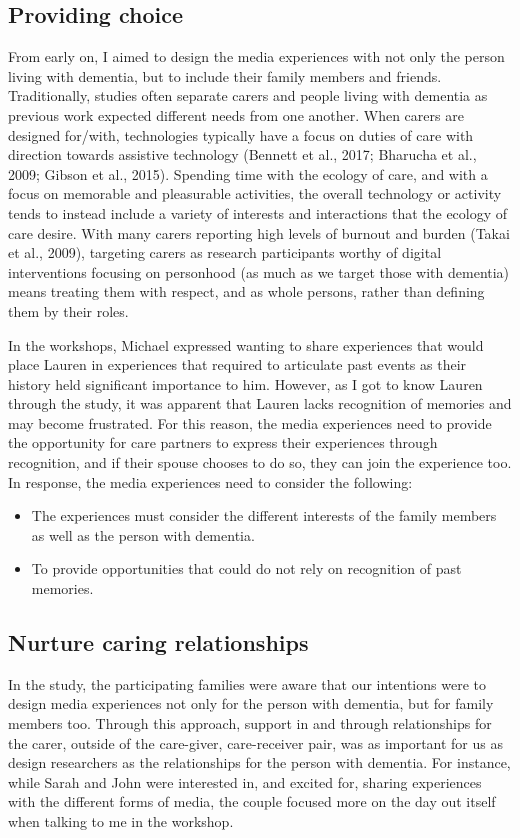 \subsection{Providing choice}
\label{DR:ProvidingChoice}
From early on, I aimed to design the media experiences with not only the person living with dementia, but to include their family members and friends. Traditionally, studies often separate carers and people living with dementia as previous work expected different needs from one another. When carers are designed for/with, technologies typically have a focus on duties of care with direction towards assistive technology (Bennett et al., 2017; Bharucha et al., 2009; Gibson et al., 2015). Spending time with the ecology of care, and with a focus on memorable and pleasurable activities, the overall technology or activity tends to instead include a variety of interests and interactions that the ecology of care desire. With many carers reporting high levels of burnout and burden (Takai et al., 2009), targeting carers as research participants worthy of digital interventions focusing on personhood (as much as we target those with dementia) means treating them with respect, and as whole persons, rather than defining them by their roles.

In the workshops, Michael expressed wanting to share experiences that would place Lauren in experiences that required to articulate past events as their history held significant importance to him. However, as I got to know Lauren through the study, it was apparent that Lauren lacks recognition of memories and may become frustrated. For this reason, the media experiences need to provide the opportunity for care partners to express their experiences through recognition, and if their spouse chooses to do so, they can join the experience too. In response, the media experiences need to consider the following:
\begin{itemize}
    \item The experiences must consider the different interests of the family members as well as the person with dementia. 
    \item To provide opportunities that could do not rely on recognition of past memories.
\end{itemize}

\subsection{Nurture caring relationships}
\label{CaringRelationships}
In the study, the participating families were aware that our intentions were to design media experiences not only for the person with dementia, but for family members too. Through this approach, support in and through relationships for the carer, outside of the care-giver, care-receiver pair, was as important for us as design researchers as the relationships for the person with dementia. For instance, while Sarah and John were interested in, and excited for, sharing experiences with the different forms of media, the couple focused more on the day out itself when talking to me in the workshop. 

